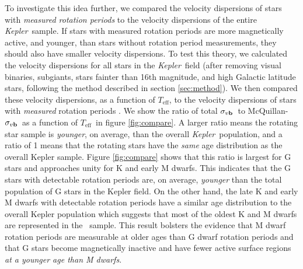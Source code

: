 \documentclass{aastex63}
\newcommand{\ie}{{\it i.e.}}
\newcommand{\kepler}{{\it Kepler}}
\newcommand{\Kepler}{{\it Kepler}}
\newcommand{\teff}{$T_{\mathrm{eff}}$}
\newcommand{\sigmavb}{$\sigma_{v{\bf b}}$}
\newcommand{\mct}{\citet{mcquillan2014}}
\newcommand{\racomment}[1]{{\color{black}#1}}
\begin{document}
\racomment{
    To investigate this idea further, we compared the velocity dispersions of
stars with {\it measured rotation periods} to the velocity dispersions of the
entire \kepler\ sample.
If stars with measured rotation periods are more magnetically active, and
younger, than stars without rotation period measurements, they should also
have smaller velocity dispersions.
To test this theory, we calculated the velocity dispersions for all stars in
the \kepler\ field (after removing visual binaries, subgiants, stars fainter
than 16th magnitude, and high Galactic latitude stars, following the method
described in section \ref{sec:method}).
We then compared these velocity dispersions, as a function of
\teff, to the velocity dispersions of stars with {\it measured} rotation
periods \citep[\ie\ stars that appear in table 1 of][]{mcquillan2014}.
We show the ratio of total \sigmavb\ to McQuillan-\sigmavb\ as a
function of \teff\ in figure \ref{fig:compare}.}
A larger ratio means the rotating star sample is {\it younger}, on average,
than the overall \Kepler\ population, and a ratio of 1 means that the rotating
stars have the {\it same} age distribution as the overall Kepler sample.
Figure \ref{fig:compare} shows that this ratio is largest for G stars and
approaches unity for K and early M dwarfs.
This indicates that the G stars with detectable rotation periods are, on
average, {\it younger} than the total population of G stars in the Kepler
field.
On the other hand, the late K and early M dwarfs with detectable rotation
periods have a similar age distribution to the overall Kepler population which
suggests that \racomment{most of}
the oldest K and M dwarfs are represented in
the \mct\ sample.
This result bolsters the evidence that M dwarf rotation periods are measurable
at older ages than G dwarf rotation periods and that G stars become
magnetically inactive and have fewer active surface regions {\it at a younger
age than M dwarfs}.
\end{document}
